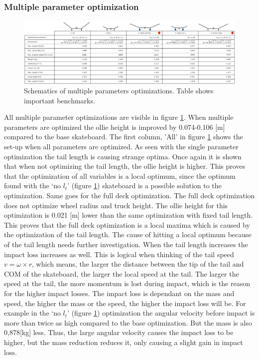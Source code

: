 \subsubsection{Multiple parameter optimization}
\begin{figure}
    \centering
    \includegraphics[trim={0cm 0cm 0cm 0cm},clip,width=\textwidth]{figure/Results/multi_optimize_table_dpi600.png}
    \caption[Geometry solutions and benchmarks for multiple parameter optimization]{Schematics of multiple parameters optimizations. Table shows important benchmarks.}
    \label{f_multipar}
\end{figure}

\noindent All multiple parameter optimizations are visible in figure \ref{f_multipar}. When multiple parameters are optimized the ollie height is improved by 0.074-0.106 [m] compared to the base skateboard. The first column, 'All' in figure \ref{f_multipar} shows the set-up when all parameters are optimized. As seen with the single parameter optimization the tail length is causing strange optima. Once again it is shown that when not optimizing the tail length, the ollie height is higher. This proves that the optimization of all variables is a local optimum, since the optimum found with the `no $l_t$' (figure \ref{f_multipar}) skateboard is a possible solution to the optimization. Same goes for the full deck optimization. The full deck optimization does not optimize wheel radius and truck height. The ollie height for this optimization is 0.021 [m] lower than the same optimization with fixed tail length. This proves that the full deck optimization is a local maxima which is caused by the optimization of the tail length. The cause of hitting a local optimum because of the tail length needs further investigation. When the tail length increases the impact loss increases as well. This is logical when thinking of the tail speed $v = \omega \times r$, which means, the larger the distance between the tip of the tail and COM of the skateboard, the larger the local speed at the tail. The larger the speed at the tail, the more momentum is lost during impact, which is the reason for the higher impact losses. The impact loss is dependant on the mass and speed, the higher the mass or the speed, the higher the impact loss will be. For example in the `no $l_t$' (figure \ref{f_multipar}) optimization the angular velocity before impact is more than twice as high compared to the base optimization. But the mass is also 0,878[kg] less. Thus, the large angular velocity causes the impact loss to be higher, but the mass reduction reduces it, only causing a slight gain in impact loss. 

